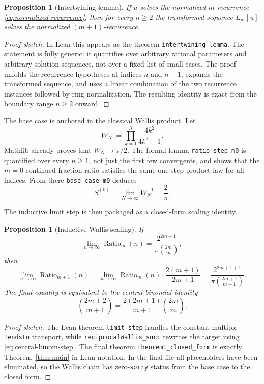 \documentclass[11pt,reqno]{amsart}
\newcommand{\WallisValue}[1]{\frac{2^{2#1+1}}{\pi\binom{2#1}{#1}}}
\newcommand{\WallisStep}[1]{\frac{2(#1+1)}{2#1+1}}
\theoremstyle{plain}
\newtheorem{proposition}[theorem]{Proposition}
\theoremstyle{definition}
\theoremstyle{remark}
\begin{document}
\begin{proposition}[Intertwining lemma]\label{prop:intertwining}
If $u$ solves the normalized $m$-recurrence \eqref{eq:normalized-recurrence}, then for every $n \ge 2$ the transformed sequence $L_m[u]$ solves the normalized $(m+1)$-recurrence.
\end{proposition}

\begin{proof}[Proof sketch]
In Lean this appears as the theorem \texttt{intertwining\_lemma}.  The statement is fully generic: it quantifies over arbitrary rational parameters and arbitrary solution sequences, not over a fixed list of small cases.  The proof unfolds the recurrence hypotheses at indices $n$ and $n-1$, expands the transformed sequence, and uses a linear combination of the two recurrence instances followed by ring normalization.  The resulting identity is exact from the boundary range $n \ge 2$ onward.
\end{proof}

The base case is anchored in the classical Wallis product.  Let
\[
  W_N := \prod_{k=1}^{N}\frac{4k^2}{4k^2-1}.
\]
Mathlib already proves that $W_N \to \pi/2$.  The formal lemma \texttt{ratio\_step\_m0} is quantified over every $n \ge 1$, not just the first few convergents, and shows that the $m=0$ continued-fraction ratio satisfies the same one-step product law for all indices.  From there \texttt{base\_case\_m0} deduces
\[
  S^{(0)} = \lim_{N\to\infty} W_N^{-1} = \frac{2}{\pi}.
\]

The inductive limit step is then packaged as a closed-form scaling identity.

\begin{proposition}[Inductive Wallis scaling]\label{prop:limit-step}
If
\[
  \lim_{n\to\infty} \operatorname{Ratio}_m(n) = \WallisValue{m},
\]
then
\[
  \lim_{n\to\infty} \operatorname{Ratio}_{m+1}(n)
  = \lim_{n\to\infty} \operatorname{Ratio}_m(n)\cdot \WallisStep{m}
  = \WallisValue{m+1}.
\]
The final equality is equivalent to the central-binomial identity
\begin{equation}\label{eq:central-binom-step}
  \binom{2m+2}{m+1} = \frac{2(2m+1)}{m+1}\binom{2m}{m}.
\end{equation}
\end{proposition}

\begin{proof}[Proof sketch]
The Lean theorem \texttt{limit\_step} handles the constant-multiple \texttt{Tendsto} transport, while \texttt{reciprocalWallis\_succ} rewrites the target using \eqref{eq:central-binom-step}.  The final theorem \texttt{theorem1\_closed\_form} is exactly Theorem~\ref{thm:main} in Lean notation.  In the final file all placeholders have been eliminated, so the Wallis chain has zero-\texttt{sorry} status from the base case to the closed form.
\end{proof}
\end{document}
